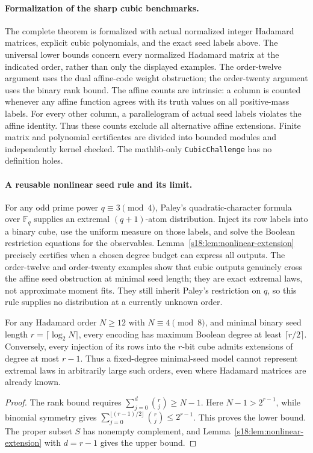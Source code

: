 \paragraph{Formalization of the sharp cubic benchmarks.}
The complete theorem is formalized with actual normalized integer
Hadamard matrices, explicit cubic polynomials, and the exact seed labels
above. The universal lower bounds concern every normalized Hadamard
matrix at the indicated order, rather than only the displayed examples.
The order-twelve argument uses the dual affine-code weight obstruction;
the order-twenty argument uses the binary rank bound.
The affine counts are intrinsic: a column is counted whenever any affine
function agrees with its truth values on all positive-mass labels.
For every other column, a parallelogram of actual seed labels violates
the affine identity. Thus these counts exclude all alternative affine
extensions. Finite matrix and polynomial certificates are divided into
bounded modules and independently kernel checked. The mathlib-only
\texttt{CubicChallenge} has no definition holes.

\paragraph{A reusable nonlinear seed rule and its limit.}
For any odd prime power $q\equiv3\pmod4$, Paley's quadratic-character
formula over $\mathbb F_q$ supplies an extremal $(q+1)$-atom distribution.
Inject its row labels into a binary cube, use the uniform measure on
those labels, and solve the Boolean restriction equations for the
observables. Lemma~\ref{s18:lem:nonlinear-extension} precisely certifies when
a chosen degree budget can express all outputs. The order-twelve and
order-twenty examples show that cubic outputs genuinely cross the affine
seed obstruction at minimal seed length; they are exact extremal laws,
not approximate moment fits. They still inherit Paley's restriction on
$q$, so this rule supplies no distribution at a currently unknown order.

\begin{corollary}
\label{s18:cor:nonlinear-growing-degree}
For any Hadamard order $N\ge12$ with $N\equiv4\pmod8$, and minimal
binary seed length $r=\lceil\log_2N\rceil$, every encoding has maximum
Boolean degree at least $\lceil r/2\rceil$. Conversely, every injection
of its rows into the $r$-bit cube admits extensions of degree at most
$r-1$. Thus a fixed-degree minimal-seed model cannot represent extremal
laws in arbitrarily large such orders, even where Hadamard matrices
are already known.
\end{corollary}
\begin{proof}
The rank bound requires $\sum_{j=0}^d\binom rj\ge N-1$.
Here $N-1>2^{r-1}$, while binomial symmetry gives
$\sum_{j=0}^{\lfloor(r-1)/2\rfloor}\binom rj\le2^{r-1}$.
This proves the lower bound. The proper subset $S$ has nonempty
complement, and Lemma~\ref{s18:lem:nonlinear-extension} with $d=r-1$
gives the upper bound.
\end{proof}


